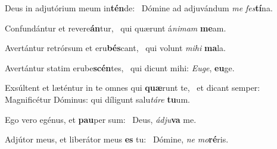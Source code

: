 \item Deus in adjutórium meum in\textbf{tén}de:~\psstar{} Dómine ad adjuvándum \textit{me} \textit{fes}\textbf{tí}na.
\item Confundántur et revere\textbf{án}\-tur,~\psstar{} qui quærunt á\textit{nimam} \textbf{me}am.
\item Avertántur retrórsum et eru\textbf{bés}cant,~\psstar{} qui volunt \textit{mihi} \textbf{ma}la.
\item Avertántur statim erube\textbf{scén}\-tes,~\psstar{} qui dicunt mihi: \textit{Euge}, \textbf{eu}ge.
\item Exsúltent et læténtur in te omnes qui \textbf{quæ}runt te,~\psstar{} et dicant semper: Magnificétur Dóminus: qui díligunt salu\textit{táre} \textbf{tu}um.
\item Ego vero egénus, et \textbf{pau}per sum:~\psstar{} Deus, \textit{ádju}\textbf{va} me.
\item Adjútor meus, et liberátor meus \textbf{es} tu:~\psstar{} Dómine, \textit{ne} \textit{mo}\textbf{ré}ris.
